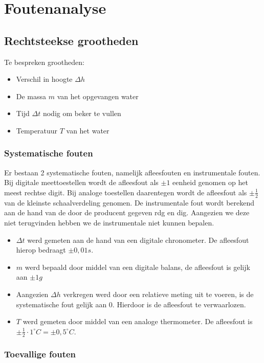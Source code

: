 \section{Foutenanalyse}

\subsection{Rechtsteekse grootheden}

Te bespreken grootheden:
\begin{itemize}
    \item Verschil in hoogte $\Delta h$
    \item De massa $m$ van het opgevangen water
    \item Tijd $\Delta t$ nodig om beker te vullen
    \item Temperatuur $T$ van het water
\end{itemize}

\subsubsection{Systematische fouten}
Er bestaan 2 systematische fouten, namelijk afleesfouten en instrumentale fouten. Bij digitale meettoestellen wordt de afleesfout als $\pm 1$ eenheid genomen op het meest rechtse digit. 
Bij analoge toestellen daarentegen wordt de afleesfout als $\pm \frac{1}{2}$ van de kleinste schaalverdeling genomen. De instrumentale fout wordt berekend aan de hand van de door de producent gegeven rdg en dig. Aangezien we deze niet terugvinden hebben we de instrumentale niet kunnen bepalen.
\begin{itemize}
    \item $\Delta t$ werd gemeten aan de hand van een digitale chronometer. De afleesfout hierop bedraagt $\pm 0,01 s$.
    \item $m$ werd bepaald door middel van een digitale balans, de afleesfout is gelijk aan $\pm 1g$
    \item Aangezien $\Delta h$ verkregen werd door een relatieve meting uit te voeren, is de systematische fout gelijk aan 0. Hierdoor is de afleesfout te verwaarlozen.
    \item $T$ werd gemeten door middel van een analoge thermometer. De afleesfout is $\pm \frac{1}{2} \cdot 1^{\circ}C = \pm 0,5^{\circ}C$.
\end{itemize} 

\subsubsection{Toevallige fouten}

